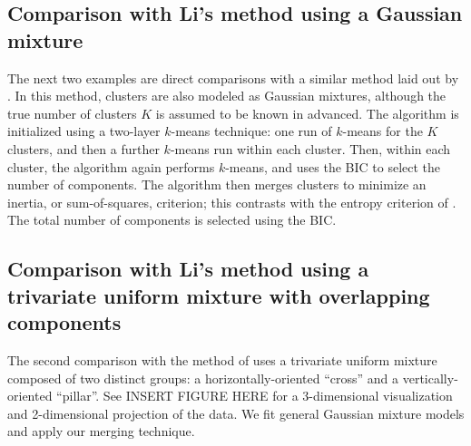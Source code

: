 \documentclass{uwstat572}
\renewcommand\;{\,}
\begin{document}
\begin{figure}
\begin{center}
\end{center}
\end{figure}

\subsection{Comparison with Li's method using a Gaussian mixture}
The next two examples are direct comparisons with a similar method laid out by \cite{Li05}.
In this method, clusters are also modeled as Gaussian mixtures, although the true number of clusters $K$ is assumed to be known in advanced.
The algorithm is initialized using a two-layer $k$-means technique: one run of $k$-means for the $K$ clusters, and then a further $k$-means run within each cluster.
Then, within each cluster, the algorithm again performs $k$-means, and uses the BIC to select the number of components. 
The algorithm then merges clusters to minimize an inertia, or sum-of-squares, criterion; this contrasts with the entropy criterion of \cite{Baudry10}.
The total number of components is selected using the BIC.

 \begin{figure}
\begin{center}
\end{center}
\end{figure}

\subsection{Comparison with Li's method using a trivariate uniform mixture with overlapping components}
The second comparison with the method of \cite{Li05} uses a trivariate uniform mixture composed of two distinct groups: a horizontally-oriented ``cross'' and a vertically-oriented ``pillar''.
See INSERT FIGURE HERE for a 3-dimensional visualization and 2-dimensional projection of the data.
We fit general Gaussian mixture models and apply our merging technique.
\end{document}

